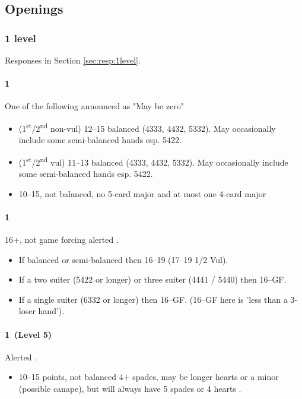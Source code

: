 
\subsection{Openings}
\label{sec:openings}

\subsubsection{1 level}
\label{sec:open:1level}

Responses in Section \ref{sec:resp:1level}.

\paragraph{1\clubs}

One of the following  announced as "May be zero" 

\begin{itemize}
\item (1\textsuperscript{st}/2\textsuperscript{nd} non-vul) 12--15 balanced (4333, 4432, 5332). May occasionally include some semi-balanced hands esp. 5422.
\item (1\textsuperscript{st}/2\textsuperscript{nd} vul) 11--13 balanced (4333, 4432, 5332). May occasionally include some semi-balanced hands esp. 5422.

\item 10--15, not balanced, no 5-card major and at most one 4-card major
\end{itemize}

\paragraph{1\diamonds}

16+, not game forcing  alerted . 
\begin{itemize}
\item If balanced or semi-balanced then 16--19 (17--19 1/2 Vul). 
\item If a two suiter (5422 or longer) or three suiter (4441 / 5440) then 16--GF. 
\item If a single suiter (6332 or longer) then 16--GF. (16--GF here is 'less than a 3-loser hand').
\end{itemize}

{\it

\paragraph{1\hearts~(Level 5)}

Alerted .

\begin{itemize}
\item 10--15 points, not balanced 4+ spades, may be longer hearts or a minor (possible canape), but will always have 5 spades or 4 hearts .
\end{itemize}

}

